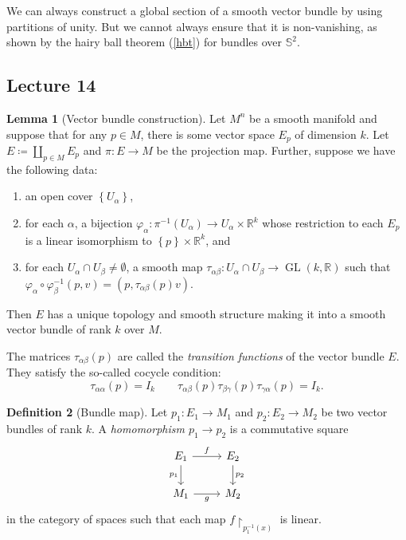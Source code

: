 \documentclass[10pt,letterpaper,cm]{nupset}
\theoremstyle{definition}
\newtheorem{definition}{Definition}[subsection]
\theoremstyle{theorem}
\newtheorem{lemma}[definition]{Lemma}
\theoremstyle{remark}
\newcommand{\R}{\mathbb R}
\renewcommand{\S}{\mathbb S}
\newcommand{\1}{\mathbf{1}}
\newcommand{\0}{\vec 0}
\DeclareMathOperator{\GL}{GL}
\begin{document}
We can always construct a global section of a smooth vector bundle by using partitions of unity. But we cannot always ensure that it is non-vanishing, as shown by the hairy ball theorem (\cref{hbt}) for bundles over $\S^2$.


\subsection{Lecture 14}

\begin{lemma}[Vector bundle construction]
Let $M^n$ be a smooth manifold and suppose that for any $p\in M$, there is some vector space $E_p$ of dimension $k$. Let $E\coloneqq  \coprod_{p\in M} E_p$ and $\pi : E \to M$ be the projection map. Further, suppose we have the following data:
\begin{enumerate}[label=(\alph*)]
\item an open cover $\left\{U_{\alpha}\right\}$,
\item for each $\alpha$, a bijection $\varphi_{\alpha} : \pi^{-1}(U_{\alpha}) \to U_{\alpha} \times \R^k$ whose restriction to each $E_p$ is a linear isomorphism to $\left\{p\right\}\times \R^k$, and
\item for each $U_{\alpha} \cap U_{\beta} \ne \emptyset$, a smooth map $\tau_{\alpha \beta} : U_{\alpha} \cap U_{\beta} \to \GL(k , \R)$ such that $\varphi_{\alpha} \circ \varphi_{\beta}^{-1}(p, v) = \left(p, \tau_{\alpha \beta}(p)v\right)$.
\end{enumerate}
Then $E$ has a unique topology and smooth structure making it into a smooth vector bundle of rank $k$ over $M$.
\end{lemma}

The matrices $\tau_{\alpha \beta}(p)$ are called the \textit{transition functions} of the vector bundle $E$. They satisfy the so-called cocycle condition: 
\[ \tau_{\alpha \alpha}(p) = I_k \quad \quad \tau_{\alpha \beta}(p)\tau_{\beta \gamma}(p)\tau_{\gamma \alpha}(p) = I_k.\]

\begin{definition}[Bundle map]
Let $p_1 : E_1 \to M_1$ and $p_2 : E_2 \to M_2$ be two vector bundles of rank $k$. A \textit{homomorphism $p_1 \to p_2$} is a commutative square
\[
\begin{tikzcd}
E_1 \arrow[d, "p_1"'] \arrow[r, "f"] & E_2 \arrow[d, "p_2"] \\
M_1 \arrow[r, "g"']                  & M_2                 
\end{tikzcd}
\] in the category of spaces such that each map $f\restriction_{p_1^{-1}(x)}$ is  linear. 
\end{definition}
\end{document}
